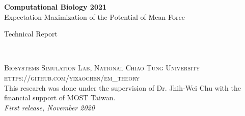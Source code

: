 \documentclass[11pt,fleqn]{book} %
\begin{document}

\begingroup
\thispagestyle{empty}
\centering
\vspace*{5cm}
\par\normalfont\fontsize{35}{35}\sffamily\selectfont
\textbf{Computational Biology 2021}\\
{\LARGE Expectation-Maximization of the Potential of Mean Force}\par %
\vspace*{1cm}
{\Huge Technical Report}\par %
\endgroup


\newpage
~\vfill
\thispagestyle{empty}


\noindent \textsc{Biosystems Simulation Lab, National Chiao Tung University}\\

\noindent \textsc{https://github.com/yizaochen/em_theory}\\ %

\noindent This research was done under the supervision of Dr. Jhih-Wei Chu with the financial support of MOST Taiwan.\\ %

\noindent \textit{First release, November 2020} %



\pagestyle{empty} %

\tableofcontents %

\end{document}
